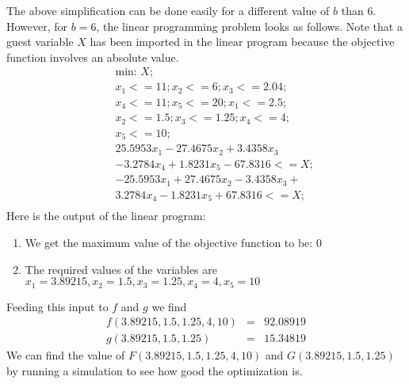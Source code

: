 \documentclass[journal]{IEEEtran}
\begin{document}
The above simplification can be done easily for a different value of $b$ than $6$. However, for $b=6$, the linear programming problem looks as follows. Note that a guest variable $X$ has been imported in the linear program because the objective function involves an absolute value.
	\begin{eqnarray*}
		& & \text{min: } X;\\
		& & x_1 <= 11; x_2 <= 6; x_3 <= 2.04; \\
		& & x_4 <= 11; x_5 <= 20; x_1 <= 2.5; \\
		& & x_2 <= 1.5; x_3 <= 1.25; x_4 <= 4; \\
		& & x_5 <= 10; \\
		& & 25.5953 x_1 -  27.4675 x_2 + 3.4358 x_3 \\
		& & - 3.2784 x_4 + 1.8231 x_5 - 67.8316 <= X; \\
		& & -25.5953 x_1 +  27.4675 x_2 - 3.4358 x_3 + \\
		& & 3.2784 x_4 - 1.8231 x_5 + 67.8316 <= X; \\
	\end{eqnarray*}
Here is the output of the linear program:
\begin{enumerate}
	\item We get the maximum value of the objective function to be: $0$
	\item The required values of the variables are $x_1 = 3.89215,x_2 = 1.5,x_3 = 1.25, x_4 = 4, x_5 = 10$
\end{enumerate}

Feeding this input to $f$ and $g$ we find 
	\begin{eqnarray*}
		f(3.89215, 1.5, 1.25, 4,10) &=& 92.08919\\
		g(3.89215, 1.5, 1.25) &=& 15.34819
	\end{eqnarray*}
We can find the value of $F(3.89215, 1.5, 1.25, 4,10)$ and $G(3.89215, 1.5, 1.25)$ by running a simulation to see how good the optimization is.
\end{document}
